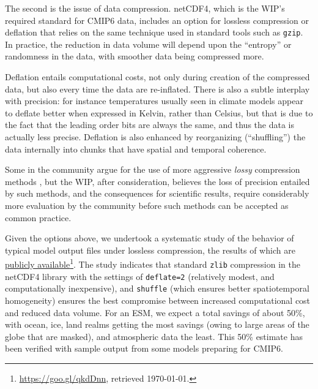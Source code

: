 \documentclass[gmd,manuscript]{copernicus}
\newcommand{\pllabel}[1]{\label{p-#1}\linelabel{l-#1}}
\newcommand{\urlref}[2] {\href{#1}{#2}\footnote{\url{#1}, retrieved \today.}}
\begin{document}
The second is the issue of data compression. netCDF4, which is the
WIP's required standard for CMIP6 data, includes an option for
lossless compression or deflation \citep{ref:zivlempel1977} that
relies on the same technique used in standard tools such as
\texttt{gzip}. In practice, the reduction in data volume will depend
upon the ``entropy'' or randomness in the data, with smoother data
being compressed more.

Deflation entails computational costs, not only during creation of the
compressed data, but also every time the data are re-inflated. There
is also a subtle interplay with precision: for instance temperatures
usually seen in climate models appear to deflate better when expressed
in Kelvin, rather than Celsius, but that is due to the fact that the
leading order bits are always the same, and thus the data is actually
less precise. Deflation is also enhanced by reorganizing
(``shuffling'') the data internally into chunks that have spatial and
temporal coherence.

Some in the community argue for the use of more aggressive
\emph{lossy} compression methods \citep{ref:bakeretal2016}, but the
WIP, after consideration, believes the loss of precision entailed by
such methods, and the consequences for scientific results, require
considerably more evaluation by the community before such methods can
be accepted as common practice.

Given the options above, we undertook a systematic study of the
behavior of typical model output files under lossless compression, the
results of which are \urlref{https://goo.gl/qkdDnn}{publicly
  available}. The study indicates that standard \texttt{zlib}
compression in the netCDF4 library with the settings of
\texttt{deflate=2} (relatively modest, and computationally
inexpensive), and \texttt{shuffle} (which ensures better
spatiotemporal homogeneity) ensures the best compromise between
increased computational cost and reduced data volume. For an ESM,
\pllabel{RC1-25}
we expect a total savings of about 50\%, with ocean, ice, land realms
getting the most savings (owing to large areas of the globe that are
masked), and atmospheric data the least. This 50\% estimate has been
verified with sample output from some models preparing for CMIP6.
\end{document}
